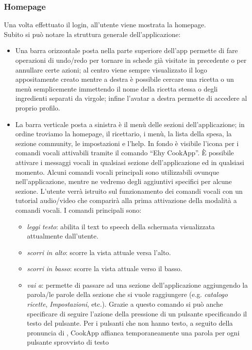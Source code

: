 \subsubsection{Homepage}
Una volta effettuato il login, all'utente viene mostrata la homepage.\\
Subito si può notare la struttura generale dell'applicazione:
\begin{itemize}
\item Una barra orizzontale posta nella parte superiore dell'app permette di fare operazioni di undo/redo per tornare in schede già visitate in precedente o per annullare certe azioni; al centro viene sempre visualizzato il logo appositamente creato mentre a destra è possibile cercare una ricetta o un menù semplicemente immettendo il nome della ricetta stessa o degli ingredienti separati da virgole; infine l'avatar a destra permette di accedere al proprio profilo.
\item La barra verticale posta a sinistra è il menù delle sezioni
dell'applicazione; in ordine troviamo la homepage, il ricettario, i
menù, la lista della spesa, la sezione community, le impostazioni e
l'help. In fondo è visibile l'icona per i comandi vocali attivabili
tramite il comando ``Ehy CookApp''.
È possibile attivare i messaggi vocali in qualsiasi sezione
dell'applicazione ed in qualsiasi momento. Alcuni
comandi vocali principali sono utilizzabili ovunque nell'applicazione,
mentre ne vedremo degli aggiuntivi specifici per alcune sezione.
L'utente verrà istruito sul funzionamento dei comandi vocali con un
tutorial audio/video che comparirà alla prima attivazione della modalità
a comandi vocali. I comandi principali sono: 
\begin{itemize} 
	\item \emph{leggi testo}: abilita il text to speech della schermata
visualizzata attualmente dall'utente.
	\item \emph{scorri in alto}: scorre la vista attuale versa l'alto.
	\item \emph{scorri in basso}: scorre la vista attuale verso il
basso.
	\item \emph{vai a}: permette di passare ad una sezione
dell'applicazione aggiungendo la parola/le parole della sezione che si vuole
raggiungere (e.g. \emph{catalogo ricette}, \emph{Impostazioni}, etc.).
Grazie a questo comando si può anche specificare di seguire l'azione
della pressione di un pulsante specificando il testo del pulsante. Per
i pulsanti che non hanno testo, a seguito della pronuncia di , CookApp affianca temporaneamente una parola per ogni pulsante sprovvisto di testo

\end{itemize}
\end{itemize}
